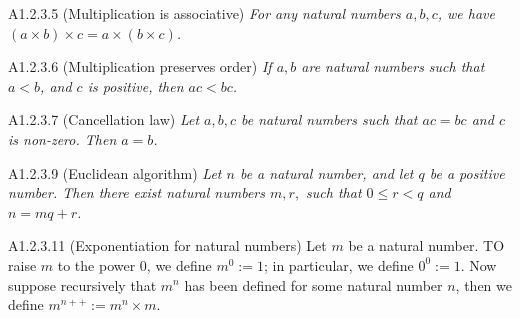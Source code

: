 \begin{lemma}{A1.2.3.5}
    (Multiplication is associative) \emph{For any natural numbers $a,b,c$, we have $(a\times b)\times c = a\times (b\times c)$.}
\end{lemma}

\begin{proposition}{A1.2.3.6}
    (Multiplication preserves order) \emph{If $a, b$ are natural numbers such that $a < b$, and $c$ is positive, then $ac < bc$.}
\end{proposition}

\begin{corollary}{A1.2.3.7}
    (Cancellation law) \emph{Let $a,b,c$ be natural numbers such that $ac=bc$ and $c$ is non-zero. Then $a=b$.}
\end{corollary}


\begin{proposition}{A1.2.3.9}
    (Euclidean algorithm) \emph{Let $n$ be a natural number, and let $q$ be a positive number. Then there exist natural numbers $m, r,$ such that $0\leq r < q$ and $n = mq+r$.}
\end{proposition}


\begin{definition}{A1.2.3.11}
    (Exponentiation for natural numbers) Let $m$ be a natural number. TO raise $m$ to the power 0, we define $m^0 := 1$; in particular, we define $0^0 := 1$. Now suppose recursively that $m^n$ has been defined for some natural number $n$, then we define $m^{n++} := m^n \times m$.
\end{definition}

